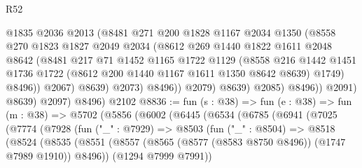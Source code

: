 \begin{lexlean}{R52}
\begin{coremodule}
                            @1835
                            @2036
                            @2013
                            (@8481
                              @271
                              @200
                              @1828
                              @1167
                              @2034
                              @1350
                              (@8558
                                @270
                                @1823
                                @1827
                                @2049
                                @2034
                                (@8612
                                  @269
                                  @1440
                                  @1822
                                  @1611
                                  @2048
                                  @8642
                                  (@8481
                                    @217
                                    @71
                                    @1452
                                    @1165
                                    @1722
                                    @1129
                                    (@8558
                                      @216
                                      @1442
                                      @1451
                                      @1736
                                      @1722
                                      (@8612 @200 @1440 @1167 @1611 @1350 @8642 @8639)
                                      @1749)
                                    @8496))
                                @2067)
                              @8639)
                            @2073)
                          @8496))
                      @2079)
                    @8639)
                  @2085)
                @8496))
            @2091)
          @8639)
        @2097)
      @8496)
    @2102
@8836 := fun (s : @38) =>
  fun (e : @38) =>
  fun (m : @38) =>
  @5702
    (@5856
      (@6002
        (@6445
          (@6534
            (@6785
              (@6941
                (@7025
                  (@7774
                    (@7928
                      (fun ("_" : @7929) =>
                      @8503
                        (fun ("_" : @8504) =>
                        @8518
                          (@8524
                            (@8535
                              (@8551
                                (@8557
                                  (@8565 (@8577 (@8583 @8750 @8496)) (@1747 @7989 @1910))
                                  @8496))
                              (@1294 @7999 @7991))

\end{coremodule}
\end{lexlean}
